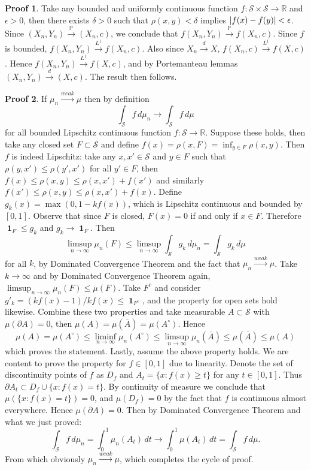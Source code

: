 \documentclass[hidelinks,11pt]{article}
\theoremstyle{definition}
\theoremstyle{dotless}
\newtheorem{prop}{Proof}[section]
\theoremstyle{remark}
\DeclareMathOperator{\1}{\mathbf{1}}
\begin{document}
\begin{prop}
Take any bounded and uniformly continuous function $f:\mathcal{S}\times\mathcal{S}\to\mathbb{R}$ and $\epsilon>0$, then there exists $\delta>0$ such that $\rho(x,y)<\delta$ implies $\abs{f(x)-f(y)}<\epsilon$. Since $(X_n,Y_n)\xrightarrow{\mathbb{P}}(X_n,c)$, we conclude that $f(X_n,Y_n)\xrightarrow{\mathbb{P}}f(X_n,c)$. Since $f$ is bounded, $f(X_n,Y_n)\xrightarrow{L^1}f(X_n,c)$. Also since $X_n\xrightarrow{d}X$, $f(X_n,c)\xrightarrow{L^1}f(X,c)$. Hence $f(X_n,Y_n)\xrightarrow{L^1}f(X,c)$, and by Portemanteau lemmas $(X_n,Y_n)\xrightarrow{d}(X,c)$. The result then follows.
\end{prop}

\begin{prop}
If $\mu_n\xrightarrow{weak}\mu$ then by definition
\[\int_\mathcal{S}f\,d\mu_n\to\int_\mathcal{S}f\,d\mu\]
for all bounded Lipschitz continuous function $f:\mathcal{S}\to\mathbb{R}$.\medbreak
Suppose these holds, then take any closed set $F\subset\mathcal{S}$ and define $f(x)=\rho(x,F)=\inf_{y\in F}\rho(x,y)$. Then $f$ is indeed Lipschitz: take any $x,x'\in\mathcal{S}$ and $y\in F$ such that $\rho(y,x')\leq\rho(y',x')$ for all $y'\in F$, then $f(x)\leq\rho(x,y)\leq\rho(x,x')+f(x')$ and similarly $f(x')\leq\rho(x,y)\leq\rho(x,x')+f(x)$. Define $g_k(x)=\max(0,1-kf(x))$, which is Lipschitz continuous and bounded by $[0,1]$. Observe that since $F$ is closed, $F(x)=0$ if and only if $x\in F$. Therefore $\1_F\leq g_k$ and $g_k\to\1_F$. Then
\[\limsup_{n\to\infty}\mu_n(F)\leq\limsup_{n\to\infty}\int_\mathcal{S}g_k\,d\mu_n=\int_\mathcal{S}g_k\,d\mu\]
for all $k$, by Dominated Convergence Theorem and the fact that $\mu_n\xrightarrow{weak}\mu$. Take $k\to\infty$ and by Dominated Convergence Theorem again, $\limsup_{n\to\infty}\mu_n(F)\leq\mu(F)$. Take $F^c$ and consider $g'_k=(kf(x)-1)/kf(x)\leq\1_{F^c}$, and the property for open sets hold likewise.\medbreak
Combine these two properties and take measurable $A\subset\mathcal{S}$ with $\mu(\partial A)=0$, then $\mu(A)=\mu(\overline{A})=\mu(A^\circ)$. Hence
\[\mu(A)=\mu(A^\circ)\leq\liminf_{n\to\infty}\mu_n(A^\circ)\leq\limsup_{n\to\infty}\mu_n(\overline{A})\leq\mu(\overline{A})\leq\mu(A)\]
which proves the statement.\medbreak
Lastly, assume the above property holds. We are content to prove the property for $f\in[0,1]$ due to linearity. Denote the set of discontinuity points of $f$ as $D_f$ and $A_t=\{x:f(x)\geq t\}$ for any $t\in[0,1]$. Thus $\partial A_t\subset D_f\cup\{x:f(x)=t\}$. By continuity of measure we conclude that $\mu(\{x:f(x)=t\})=0$, and $\mu(D_f)=0$ by the fact that $f$ is continuous almost everywhere. Hence $\mu(\partial A)=0$. Then by Dominated Convergence Theorem and what we just proved:
\[\int_\mathcal{S}f\,d\mu_n=\int_0^1\mu_n(A_t)\,dt\to\int_0^1\mu(A_t)\,dt=\int_\mathcal{S}f\,d\mu.\]
From which obviously $\mu_n\xrightarrow{weak}\mu$, which completes the cycle of proof.
\end{prop}
\end{document}
